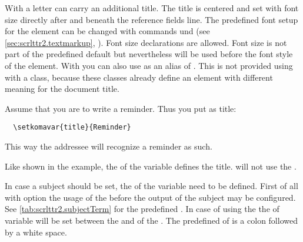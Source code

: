 \begin{Declaration}
\end{Declaration}
%
%
%
With  a letter can carry an additional title. The title is
centered and set with font size  directly after and beneath the
reference fields line.  The predefined font setup for the element
 can be changed
with commands  und  (see
\autoref{sec:scrlttr2.textmarkup},
). Font size declarations are
allowed. Font size  is not part of the predefined default
 but nevertheless will be
used before the font style of the element.  With  you can also
use  as an alias of
. This is not provided using  with
a \KOMAScript{} class, because these classes already define an element
 with different meaning for the document title.%
%
%
\begin{Example}
  Assume that you are to write a reminder. Thus you put as title:
\begin{lstlisting}
  \setkomavar{title}{Reminder}
\end{lstlisting}
  This way the addressee will recognize a reminder as such.
\end{Example}
Like shown in the example, the  of the variable defines the
title. \KOMAScript{} will not use the .%
%
\EndIndexGroup


\begin{Declaration}
\end{Declaration}
%
In case a subject should be set, the  of the variable
 need to be defined. First of all with option
 the usage 
of the  before the output of the subject may be
configured. See \autoref{tab:scrlttr2.subjectTerm} for the predefined
. In case of using the  the
 of variable  will
be set between the  and  of the
. The predefined  of 
is a colon followed by a white space.

